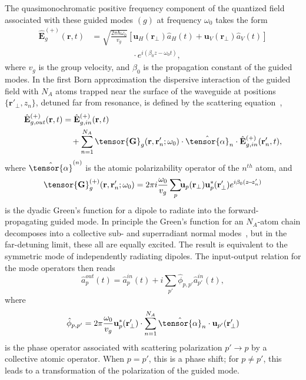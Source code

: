 \documentclass[aps,pra,twocolumn,superscriptaddress]{revtex4-1} %
\def\br{\mathbf{r}}
\newcommand{\nn}{\nonumber}
\newcommand{\mbf}[1]{\mathbf{#1}}
\begin{document}
The quasimonochromatic positive frequency component of the quantized field associated with these guided modes $(g)$ at frequency $\omega_0$ takes the form
\begin{align}\label{eq:Ebp}
\hat{\mathbf{E}}^{(+)}_g(\mbf{r}, t) &= \sqrt{ \frac{2 \pi \hbar \omega_0}{ v_g} } \left[\mathbf{u}_H(\mbf{r}\!_\perp)  \hat{a}_H(t) + \mathbf{u}_V(\mbf{r}\!_\perp) \hat{a}_V(t)\right]\nn\\
&\quad\quad\quad\quad\quad\cdot  e^{i (\beta_0 z- \omega_0 t)},
\end{align}
where $v_g$ is the group velocity, and $ \beta_0 $ is the propagation constant of the guided modes.  In the first Born approximation the dispersive interaction of the guided field with $N_A$ atoms trapped near the surface of the waveguide at positions $\{\mbf{r}'_\perp, z_n\}$, detuned far from resonance,  is defined by the scattering equation~\cite{Qi2016},
\begin{align}
\hat{\mathbf{E}}^{(+)}_{g,out}(\mbf{r}, t)&=\hat{\mathbf{E}}^{(+)}_{g,in}(\mbf{r}, t)\nn\\
&\quad+\sum_{n=1}^{N_A} \tensor{\mbf{G}}_{g} (\mbf{r}, \mbf{r}'_n;\omega_0) \cdot \hat{\tensor{\alpha}}_n \cdot \hat{\mathbf{E}}^{(+)}_{g,in}(\mbf{r}'_n, t),
\end{align}
where $\hat{\tensor{\alpha}}^{(n)}$ is the atomic polarizability operator of the $n^{th}$ atom, and 
\begin{equation}
		\tensor{\mathbf{G}}^{(+)}_g(\br,\br'_n; \omega_0) =  2\pi i \frac{\omega_0}{v_g } \sum_{p}\!\! \mathbf{u}_{p} (\br_\perp)\mathbf{u}^*_{p} 
(\br_{\perp}^\prime) e^{i \beta_0(z\!-\!z'_n)}  \label{Eq::GreensGuided}
\end{equation}
is the dyadic Green's function for a dipole to radiate into the forward-propagating guided mode.  In principle the Green's function for an $N_A$-atom chain decomposes into a collective sub- and superradiant normal modes~\cite{Asenjo-Garcia2017Atom,Asenjo-Garcia2017Exponential}, but in the far-detuning limit, these all are equally excited.  The result is equivalent to the symmetric mode of independently radiating dipoles.  The input-output relation for the mode operators then reads~\cite{Qi2016}
\begin{equation}
\hat{a}^{out}_p(t) = \hat{a}^{in}_p(t)  +i \sum_{p'} \hat{\phi}_{p,p'} \hat{a}^{in}_{p'}(t) ,
\end{equation}
where
\begin{equation}
\hat{\phi}_{p,p'} = 2\pi \frac{\omega_0}{v_g} \mbf{u}^*_p (\mbf{r}'_\perp) \cdot \sum_{n=1}^{N_A} \hat{\tensor{\alpha}}_n \cdot \mbf{u}_{p'} (\mbf{r}'_\perp)
\end{equation}
is the phase operator associated with scattering polarization $p' \rightarrow p$ by a collective atomic operator.  When $p=p'$, this is a phase shift; for $p \neq p'$, this leads to a transformation of the polarization of the guided mode.
\end{document}
